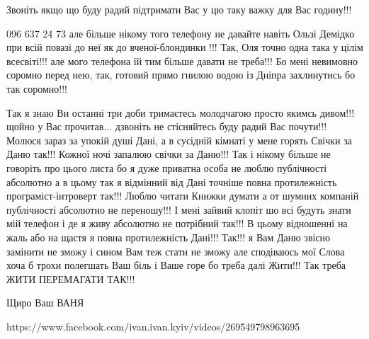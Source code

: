 Звоніть якщо що буду радий підтримати Вас у цю таку важку для Вас годину!!!

096 637 24 73 але більше нікому того телефону не давайте навіть Ользі Демідко
при всій повазі до неї як до вченої-блондинки !!! Так, Оля точно одна така у
цілім всесвіті!!! але мого телефона їй тим більше давати не треба!!! Бо мені
невимовно соромно перед нею, так, готовий прямо гнилою водою із Дніпра
захлинутись бо так соромно!!!

Так я знаю Ви останні три доби тримаєтесь молодчагою просто якимсь дивом!!!
щойно у Вас прочитав...  дзвоніть не стісняйтесь буду радий Вас почути!!!
Молюся зараз за упокій душі Дані, а в сусідній кімнаті у мене горять Свічки за
Даню так!!! Кожної ночі запалюю свічки за Даню!!! Так і нікому більше не
говоріть про цього листа бо я дуже приватна особа не люблю публічності
абсолютно а в цьому так я відмінний від Дані точніше повна протилежність
програміст-інтроверт так!!! Люблю читати Книжки думати а от шумних компаній
публічності абсолютно не переношу!!! І мені зайвий клопіт шо всі будуть знати
мій телефон і де я живу абсолютно не потрібний так!!!  В цьому відношенні на
жаль або на щастя я повна протилежність Дані!!!  Так!!! я Вам Даню звісно
замінити не зможу і сином Вам теж стати не зможу але сподіваюсь мої Слова хоча
б трохи полегшать Ваш біль і Ваше горе бо треба далі Жити!!! Так треба ЖИТИ
ПЕРЕМАГАТИ ТАК!!!

Щиро Ваш ВАНЯ

https://www.facebook.com/ivan.ivan.kyiv/videos/269549798963695
